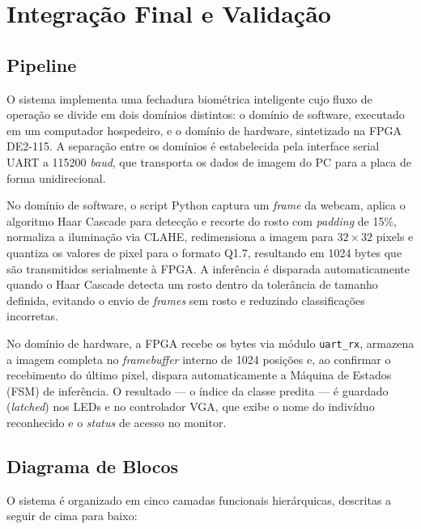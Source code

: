 \chapter{Integração Final e Validação}

\section{Pipeline}
O sistema implementa uma fechadura biométrica inteligente cujo fluxo de operação se divide em dois domínios distintos: o domínio de software, executado em um computador hospedeiro, e o domínio de hardware, sintetizado na FPGA DE2-115. A separação entre os domínios é estabelecida pela interface serial UART a 115200 \textit{baud}, que transporta os dados de imagem do PC para a placa de forma unidirecional.

No domínio de software, o script Python captura um \textit{frame} da webcam, aplica o algoritmo Haar Cascade para detecção e recorte do rosto com \textit{padding} de 15\%, normaliza a iluminação via CLAHE, redimensiona a imagem para $32 \times 32$ pixels e quantiza os valores de pixel para o formato Q1.7, resultando em 1024 bytes que são transmitidos serialmente à FPGA. A inferência é disparada automaticamente quando o Haar Cascade detecta um rosto dentro da tolerância de tamanho definida, evitando o envio de \textit{frames} sem rosto e reduzindo classificações incorretas.

No domínio de hardware, a FPGA recebe os bytes via módulo \texttt{uart\_rx}, armazena a imagem completa no \textit{framebuffer} interno de 1024 posições e, ao confirmar o recebimento do último pixel, dispara automaticamente a Máquina de Estados (FSM) de inferência. O resultado — o índice da classe predita — é guardado (\textit{latched}) nos LEDs e no controlador VGA, que exibe o nome do indivíduo reconhecido e o \textit{status} de acesso no monitor.

\section{Diagrama de Blocos}
O sistema é organizado em cinco camadas funcionais hierárquicas, descritas a seguir de cima para baixo:


